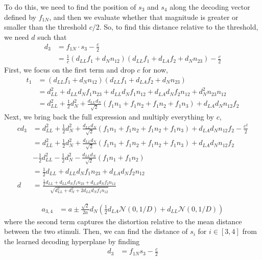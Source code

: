 \documentclass[letter,12pt]{article}
\newcommand{\dll}{d_{LL}}
\newcommand{\dla}{d_{LA}}
\newcommand{\dn}{d_{N}}
\newcommand{\dis}{\mathcal{N}(0, 1/D)}
\begin{document}
To do this, we need to find the position
of $s_{3}$ and $s_{4}$ along the decoding vector defined by $f_{1N}$, and then
we evaluate whether that magnitude is greater or smaller than the threshold
$c/2$. So, to find this distance relative to the threshold, we need $d$ such
that
\begin{align}
  d_{3} &= f_{1N} \cdot s_{3} - \frac{c}{2} \\
  &= \frac{1}{c}\left(\dll f_{1} + \dn n_{12}\right)
  \left(\dll f_{1} + \dla f_{2} + \dn n_{23}\right) - \frac{c}{2} 
\end{align}
First, we focus on the first term and drop $c$ for now,
\begin{align}
  t_{1} &= \left(\dll f_{1} + \dn n_{12}\right)
  \left(\dll f_{1} + \dla f_{2} + \dn n_{23}\right) \\
  &= \dll^{2} + \dll \dn f_{1} n_{23} + \dll \dn f_{1} n_{12}
  + \dla \dn f_{2} n_{12} + \dn^{2} n_{23} n_{12} \\
  &= \dll^{2} + \frac{1}{2}\dn^{2}
  + \frac{\dll \dn}{\sqrt{2}}\left(f_{1}n_{1} + f_{1}n_{2}
  + f_{1}n_{2} + f_{1}n_{3}\right) + \dla \dn n_{12}f_{2} 
\end{align}
Next, we bring back the full expression and multiply everything by $c$,
\begin{align}
  c d_{3} &= \dll^{2} + \frac{1}{2}\dn^{2}
  + \frac{\dll \dn}{\sqrt{2}}\left(f_{1}n_{1} + f_{1}n_{2}
  + f_{1}n_{2} + f_{1}n_{3}\right) + \dla \dn n_{12}f_{2}
  - \frac{c^{2}}{2} \\
  &= \dll^{2} + \frac{1}{2}\dn^{2}
  + \frac{\dll \dn}{\sqrt{2}}\left(f_{1}n_{1} + f_{1}n_{2}
  + f_{1}n_{2} + f_{1}n_{3}\right) + \dla \dn n_{12}f_{2}
  \\ &- \frac{1}{2}\dll^{2} - \frac{1}{2} \dn^{2}
  - \frac{\dll\dn}{\sqrt{2}}\left(f_{1}n_{1} + f_{1}n_{2}\right) \\
  &= \frac{1}{2}\dll + \dll\dn f_{1}n_{23} + \dla\dn f_{2}n_{12} \\
  d &= \frac{\frac{1}{2}\dll + \dll\dn f_{1}n_{23} + \dla\dn f_{2}n_{12}}
  {\sqrt{\dll^{2} + \dn^{2} + 2 \dll \dn f_{1}n_{12}}}
\end{align}




\begin{align}
  a_{3,4} &= a \pm \frac{\sqrt{2}}{2a}\dn \left(\frac{1}{2}\dla \dis
  + \dll \dis\right)
\end{align}
where the second term captures the distortion relative to the mean distance
between the two stimuli. Then, we can find the distance of $s_{i}$ for $i \in
[3, 4]$ from the learned decoding hyperplane by finding
\begin{align}
  d_{3} &= f_{1N} s_{3} - \frac{c}{2}
\end{align}
\end{document}
